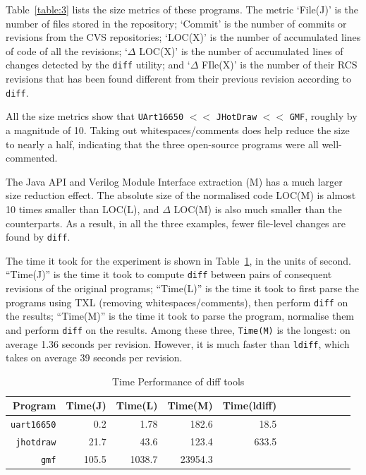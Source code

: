 \documentclass[10pt, conference, compsocconf]{IEEEtran}
\begin{document}
{Table~\ref{table:3} lists the size metrics of these programs. The metric `File(J)'  is the number of files stored in the repository; `Commit' is the number of commits or revisions from the CVS repositories; `LOC(X)' is the number of accumulated lines of code of all the revisions; `$\Delta$ LOC(X)' is the number of accumulated lines of changes detected by the {\tt diff} utility; and `$\Delta$ FIle(X)' is the number of their RCS revisions that has been found different from their previous revision according to {\tt diff}.

All the size metrics show that  {\tt UArt16650} $<<$ {\tt JHotDraw} $<<$ {\tt GMF}, roughly by a magnitude of 10. 
Taking out whitespaces/comments does help reduce the size to nearly a half, 
indicating that the three open-source programs were all well-commented. 

The Java API and Verilog Module Interface extraction (M) has a much larger size reduction effect. The absolute size of the normalised code LOC(M) is almost 10 times smaller than LOC(L), and $\Delta$ LOC(M) is also much smaller than the counterparts. As a result, in all the three examples, fewer file-level changes are found by {\tt diff}.

The time it took for the experiment is shown in Table~\ref{table:time}, in the units of second. ``Time(J)'' is the time it took to compute {\tt diff} between pairs of consequent revisions of the original programs; ``Time(L)'' is  the time it took to first parse the programs using TXL (removing whitespaces/comments), then perform {\tt diff} on the results; ``Time(M)'' is the time it took to parse the program, normalise them and perform {\tt diff} on the results. Among these three, {\tt Time(M)} is the longest: on 
average 1.36 seconds per revision. However, it is much faster than {\tt ldiff}, which takes on average 39 seconds per revision. 
\begin{table}\centering
\caption{Time Performance of diff tools\label{table:time}}
\begin{tabular}{| r || r | r | r || r | r || r| r|  r || r | r | r |}\hline
Program & \footnotesize  Time(J) & \footnotesize Time(L) & \footnotesize Time(M) & Time(ldiff) \\  \hline\hline
{\tt uart16650} & 0.2  & 1.78 & 182.6 & 18.5 \\\hline
{\tt jhotdraw} & 21.7 & 43.6 & 123.4 & 633.5 \\\hline
{\tt gmf} & 105.5  & 1038.7 & 23954.3 \\\hline
\hline\end{tabular}
\end{table}



}
\end{document}
